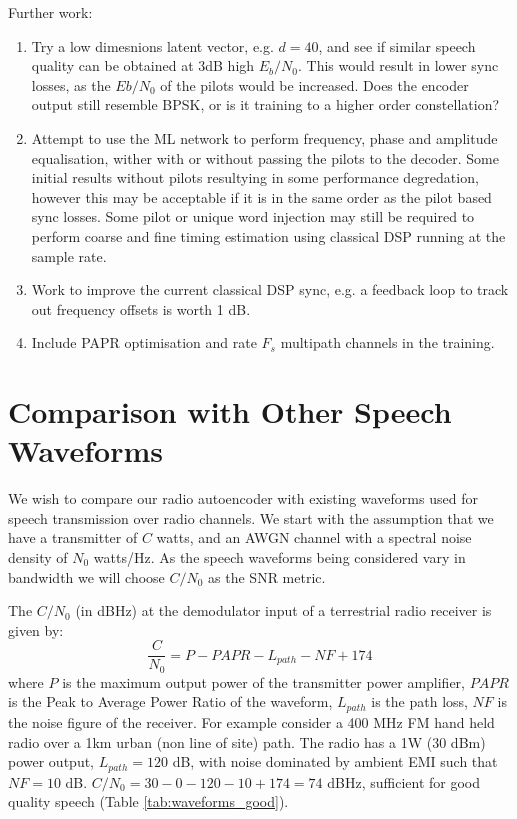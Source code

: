 \documentclass{article}
\begin{document}
Further work:
\begin{enumerate}
\item Try a low dimesnions latent vector, e.g. $d=40$, and see if similar speech quality can be obtained at 3dB high $E_b/N_0$. This would result in lower sync losses, as the $Eb/N_0$ of the pilots would be increased. Does the encoder output still resemble BPSK, or is it training to a higher order constellation?
\item Attempt to use the ML network to perform frequency, phase and amplitude equalisation, wither with or without passing the pilots to the decoder.  Some initial results without pilots resultying in some performance degredation, however this may be acceptable if it is in the same order as the pilot based sync losses. Some pilot or unique word injection may still be required to perform coarse and fine timing estimation using classical DSP running at the sample rate.
\item Work to improve the current classical DSP sync, e.g. a feedback loop to track out frequency offsets is worth 1 dB.
\item Include PAPR optimisation and rate $F_s$ multipath channels in the training.
\end{enumerate}

\section{Comparison with Other Speech Waveforms}

We wish to compare our radio autoencoder with existing waveforms used for speech transmission over radio channels.  We start with the assumption that we have a transmitter of $C$ watts, and an AWGN channel with a spectral noise density of $N_0$ watts/Hz. As the speech waveforms being considered vary in bandwidth we will choose $C/N_0$ as the SNR metric.

The $C/N_0$ (in dBHz) at the demodulator input of a terrestrial radio receiver is given by:
\begin{equation}
\frac{C}{N_0} = P - PAPR - L_{path} - NF + 174
\end{equation}
where $P$ is the maximum output power of the transmitter power amplifier, $PAPR$ is the Peak to Average Power Ratio of the waveform, $L_{path}$ is the path loss, $NF$ is the noise figure of the receiver.  For example consider a 400 MHz FM hand held radio over a 1km urban (non line of site) path.  The radio has a 1W (30 dBm) power output, $L_{path}=120$ dB, with noise dominated by ambient EMI such that $NF=10$ dB. $C/N_0 = 30 - 0 - 120 - 10 + 174 = 74$ dBHz, sufficient for good quality speech (Table \ref{tab:waveforms_good}).
\end{document}
